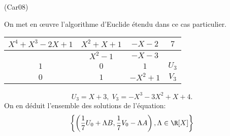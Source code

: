 \begin{tiny}(Car08)\end{tiny} On met en \oe{}uvre l'algorithme d'Euclide étendu dans ce cas particulier.
\begin{center}
\renewcommand{\arraystretch}{2}
\begin{tabular}{|c|c|c|c|}\hline
$X^4 + X^3 -2X +1$ & $X^2 + X +1$ & $-X-2$   & $7$ \\ \hline
                   & $X^2 - 1$    & $-X-3$   & \\ \hline
$1$                & $0$          & $1$      & $U_3$\\ \hline
$0$                & $1$          & $-X^2+1$ & $V_3$ \\ \hline
\end{tabular}
\end{center}
\[
 U_3 = X + 3, \; V_3 = -X^3 -3 X^2 +X +4.
\]
On en déduit l'ensemble des solutions de l'équation:
\[
 \left\lbrace \left( \frac{1}{7}U_0+\Lambda B, \frac{1}{7}V_0-\Lambda A\right), \Lambda \in \R[X] \right\rbrace 
\]
